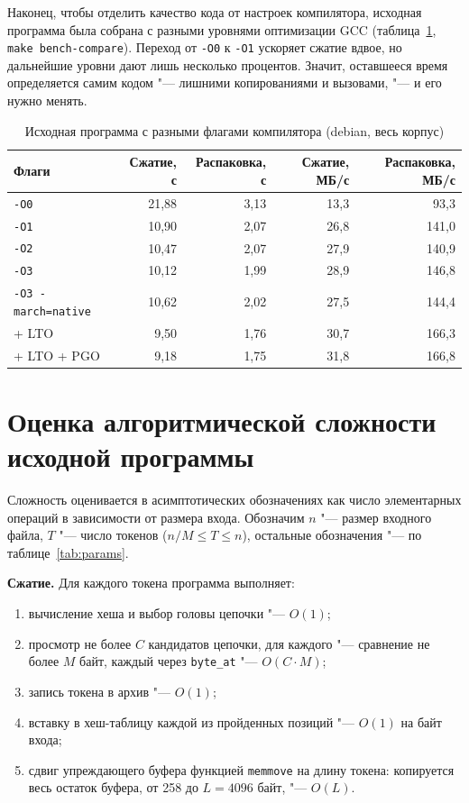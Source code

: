 Наконец, чтобы отделить качество кода от настроек компилятора, исходная
программа была собрана с разными уровнями оптимизации GCC
(таблица~\ref{tab:base-variants}, \texttt{make bench-compare}). Переход от
\texttt{-O0} к \texttt{-O1} ускоряет сжатие вдвое, но дальнейшие уровни
дают лишь несколько процентов. Значит, оставшееся время определяется самим
кодом "--- лишними копированиями и вызовами, "--- и его нужно менять.

\begin{table}[H]
\caption{Исходная программа с разными флагами компилятора (debian, весь корпус)}
\label{tab:base-variants}
\begin{tabletext}
\centering
\begin{tabular}{|l|r|r|r|r|}
\hline
\textbf{Флаги} & \textbf{Сжатие, с} & \textbf{Распаковка, с} & \textbf{Сжатие, МБ/с} & \textbf{Распаковка, МБ/с} \\
\hline
\texttt{-O0} & 21,88 & 3,13 & 13,3 & 93,3 \\
\texttt{-O1} & 10,90 & 2,07 & 26,8 & 141,0 \\
\texttt{-O2} & 10,47 & 2,07 & 27,9 & 140,9 \\
\texttt{-O3} & 10,12 & 1,99 & 28,9 & 146,8 \\
\texttt{-O3 -march=native} & 10,62 & 2,02 & 27,5 & 144,4 \\
\quad + LTO & 9,50 & 1,76 & 30,7 & 166,3 \\
\quad + LTO + PGO & 9,18 & 1,75 & 31,8 & 166,8 \\
\hline
\end{tabular}
\end{tabletext}
\end{table}

\section{Оценка алгоритмической сложности исходной программы}
\label{sec:base-complexity}

Сложность оценивается в асимптотических обозначениях
как число элементарных операций в зависимости от размера входа.
Обозначим $n$ "--- размер входного файла, $T$ "--- число токенов
($n/M \le T \le n$), остальные обозначения "--- по
таблице~\ref{tab:params}.

\textbf{Сжатие.} Для каждого токена программа выполняет:
\begin{enumerate}
\item вычисление хеша и выбор головы цепочки "--- $O(1)$;
\item просмотр не более $C$ кандидатов цепочки, для каждого "--- сравнение
не более $M$ байт, каждый через \texttt{byte\_at} "--- $O(C \cdot M)$;
\item запись токена в архив "--- $O(1)$;
\item вставку в хеш-таблицу каждой из пройденных позиций "--- $O(1)$ на байт
входа;
\item сдвиг упреждающего буфера функцией \texttt{memmove} на длину
токена: копируется весь остаток буфера, от 258 до $L = 4096$ байт, "---
$O(L)$.
\end{enumerate}

